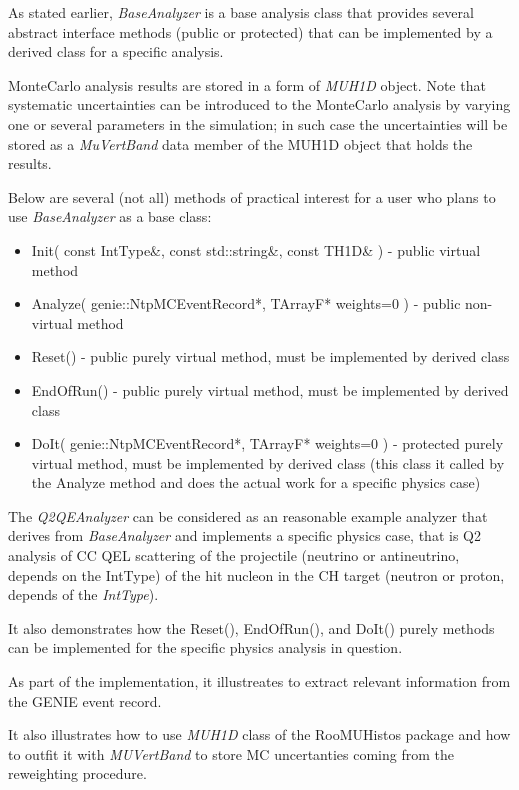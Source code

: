 As stated earlier, {\it BaseAnalyzer} is a base analysis class that provides several abstract interface methods 
(public or protected) that can be implemented by a derived class for a specific analysis. 

MonteCarlo analysis results are stored in a form of {\it MUH1D} object. Note that systematic uncertainties can be 
introduced to the MonteCarlo analysis by varying one or several parameters in the simulation; in such case the 
uncertainties will be stored as a {\it MuVertBand} data member of the MUH1D object that holds the results. 

Below are several (not all) methods of practical interest for a user who plans to use {\it BaseAnalyzer }
as a base class:
\begin{itemize}
\item{ Init( const IntType\&, const std::string\&, const TH1D\& ) - public virtual method}
\item{ Analyze( genie::NtpMCEventRecord*, TArrayF* weights=0 ) - public non-virtual method}
\item{ Reset() - public purely virtual method, must be implemented by derived class}
\item{ EndOfRun() - public purely virtual method, must be implemented by derived class}
\item{ DoIt( genie::NtpMCEventRecord*, TArrayF* weights=0 ) - protected purely virtual method, 
       must be implemented by derived class (this class it called by the Analyze method and 
       does the actual work for a specific physics case) }
\end{itemize}
 
The {\it Q2QEAnalyzer} can be considered as an reasonable example analyzer that derives from {\it BaseAnalyzer} 
and implements a specific physics case, that is Q2 analysis of CC QEL scattering of the projectile (neutrino 
or antineutrino, depends on the IntType) of the hit nucleon in the CH target (neutron or proton, depends of 
the {\it IntType}).

It also demonstrates how the Reset(), EndOfRun(), and DoIt() purely methods can be implemented for the specific
physics analysis in question.

As part of the implementation, it illustreates to extract relevant information from the GENIE event record.

It also illustrates how to use {\it MUH1D} class of the RooMUHistos package\cite{roomuhistos} and how to outfit it
with {\it MUVertBand} to store MC uncertanties coming from the reweighting procedure.

